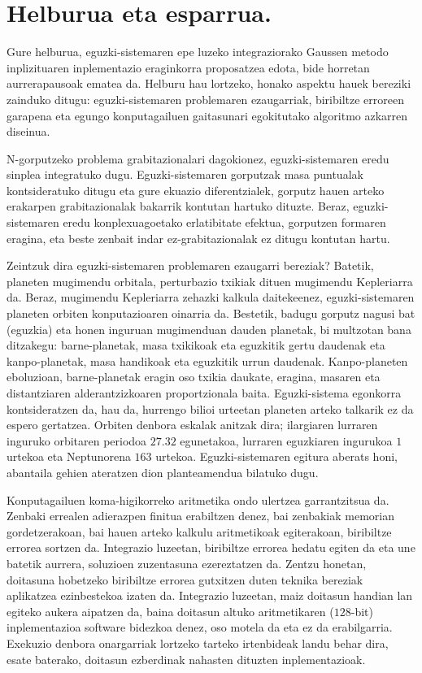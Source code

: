\section{Helburua eta esparrua.}

Gure helburua, eguzki-sistemaren epe luzeko integraziorako Gaussen metodo inplizituaren inplementazio eraginkorra proposatzea edota, bide horretan aurrerapausoak ematea da. Helburu hau lortzeko, honako aspektu hauek bereziki zainduko ditugu: eguzki-sistemaren problemaren ezaugarriak, biribiltze erroreen garapena eta egungo konputagailuen gaitasunari egokitutako algoritmo azkarren diseinua.  

N-gorputzeko problema grabitazionalari dagokionez, eguzki-sistemaren eredu sinplea integratuko dugu. Eguzki-sistemaren gorputzak masa puntualak kontsideratuko ditugu eta gure ekuazio diferentzialek, gorputz hauen arteko erakarpen grabitazionalak bakarrik kontutan hartuko dituzte. Beraz, eguzki-sistemaren eredu konplexuagoetako erlatibitate efektua, gorputzen formaren eragina, eta beste zenbait indar ez-grabitazionalak ez ditugu kontutan hartu.

Zeintzuk dira eguzki-sistemaren problemaren ezaugarri bereziak? Batetik, planeten mugimendu orbitala, perturbazio txikiak dituen mugimendu Kepleriarra da. Beraz, mugimendu Kepleriarra  zehazki kalkula daitekeenez, eguzki-sistemaren planeten orbiten konputazioaren oinarria da. Bestetik,  badugu gorputz nagusi bat (eguzkia) eta honen inguruan mugimenduan dauden planetak, bi multzotan bana ditzakegu: barne-planetak, masa txikikoak eta eguzkitik gertu daudenak eta kanpo-planetak, masa handikoak eta eguzkitik urrun daudenak. Kanpo-planeten eboluzioan, barne-planetak eragin oso txikia daukate, eragina, masaren eta distantziaren alderantzizkoaren proportzionala baita.  Eguzki-sistema egonkorra kontsideratzen da, hau da, hurrengo bilioi urteetan planeten arteko talkarik ez da espero gertatzea. Orbiten denbora eskalak anitzak dira; ilargiaren lurraren inguruko orbitaren periodoa $27.32$ egunetakoa, lurraren eguzkiaren ingurukoa $1$ urtekoa eta Neptunorena $163$ urtekoa.  Eguzki-sistemaren egitura aberats honi, abantaila gehien ateratzen dion planteamendua bilatuko dugu.
  
Konputagailuen koma-higikorreko aritmetika ondo ulertzea garrantzitsua da. Zenbaki errealen adierazpen finitua erabiltzen denez, bai zenbakiak memorian gordetzerakoan, bai hauen arteko kalkulu aritmetikoak egiterakoan, biribiltze errorea sortzen da. Integrazio luzeetan, biribiltze errorea hedatu egiten da eta une batetik aurrera, soluzioen zuzentasuna ezereztatzen da. Zentzu honetan, doitasuna hobetzeko biribiltze errorea gutxitzen duten teknika bereziak aplikatzea ezinbestekoa izaten da. Integrazio luzeetan, maiz doitasun handian lan egiteko aukera aipatzen da, baina doitasun altuko aritmetikaren ($128$-bit) inplementazioa software bidezkoa denez, oso motela da eta ez da erabilgarria. Exekuzio denbora onargarriak lortzeko tarteko irtenbideak landu behar dira, esate baterako, doitasun ezberdinak nahasten dituzten inplementazioak.       

